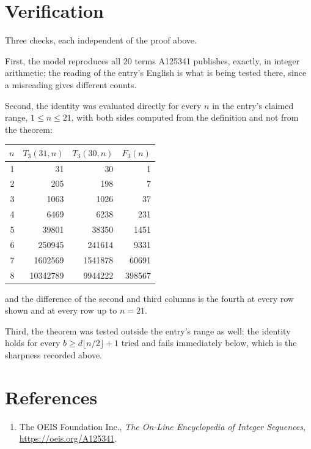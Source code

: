 \documentclass[11pt,a4paper]{article}
\theoremstyle{plain}
\theoremstyle{definition}
\begin{document}
\section{Verification}

Three checks, each independent of the proof above.

First, the model reproduces all $20$ terms A125341 publishes, exactly, in integer
arithmetic; the reading of the entry's English is what is being tested there, since a
misreading gives different counts.

Second, the identity was evaluated directly for every $n$ in the entry's claimed range,
$1\le n\le21$, with both sides computed from the definition and not from the theorem:

\begin{center}
\begin{tabular}{rrrr}
$n$ & $T_{3}(31,n)$ & $T_{3}(30,n)$ & $F_{3}(n)$ \\ \hline
1 & 31 & 30 & 1 \\
2 & 205 & 198 & 7 \\
3 & 1063 & 1026 & 37 \\
4 & 6469 & 6238 & 231 \\
5 & 39801 & 38350 & 1451 \\
6 & 250945 & 241614 & 9331 \\
7 & 1602569 & 1541878 & 60691 \\
8 & 10342789 & 9944222 & 398567 \\
\end{tabular}
\end{center}

\noindent and the difference of the second and third columns is the fourth at every row shown
and at every row up to $n=21$.

Third, the theorem was tested outside the entry's range as well: the identity holds for every
$b\ge d\lfloor n/2\rfloor+1$ tried and fails immediately below, which is the sharpness recorded
above.

\section*{References}
\begin{enumerate}
\item The OEIS Foundation Inc., \emph{The On-Line Encyclopedia of Integer Sequences},
\url{https://oeis.org/A125341}.
\end{enumerate}
\end{document}
